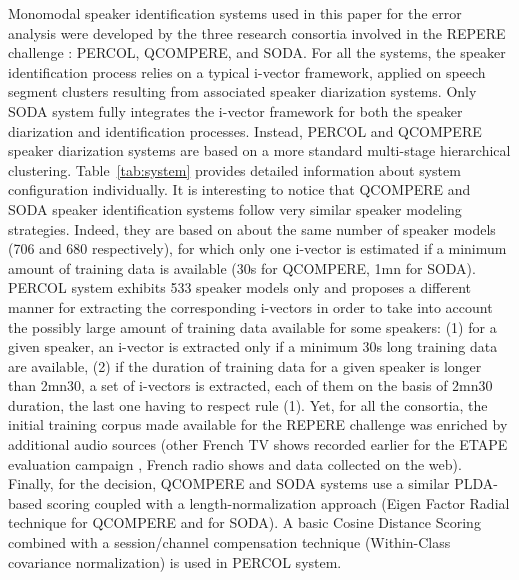 Monomodal speaker identification systems used in this paper for the error analysis were developed by the three research consortia involved in the REPERE challenge : PERCOL, QCOMPERE, and SODA. For all the systems, the speaker identification process relies on a typical i-vector framework, applied on speech segment clusters resulting from associated speaker diarization systems. Only SODA system  \cite{dupuy2014}  fully integrates the i-vector framework for both the speaker diarization and identification processes. Instead, PERCOL and QCOMPERE speaker diarization systems \cite{Barras2006,charlet2013} are based on a more standard multi-stage hierarchical clustering. Table~\ref{tab:system} provides detailed information about system configuration individually. It is interesting to notice that QCOMPERE and SODA speaker identification systems follow very similar speaker modeling strategies. Indeed, they are based on about the same number of speaker models (706 and 680 respectively), for which only one i-vector is estimated if a minimum amount of training data is available (30s for QCOMPERE, 1mn for SODA).  PERCOL system exhibits 533 speaker models only and proposes a different manner for extracting the corresponding i-vectors in order to take into account the possibly large amount of training data available for some speakers:  (1) for a given speaker, an i-vector is extracted only if a minimum 30s long training data are available, (2) if the duration of training data for a given speaker is longer than 2mn30, a set of i-vectors is extracted, each of them on the basis of 2mn30 duration, the last one having to respect rule (1). Yet, for all the consortia, the initial training corpus made available for the REPERE challenge was enriched by additional audio sources (other French TV shows recorded earlier for the ETAPE evaluation campaign \cite{gravier2012}, French radio shows and data collected on the web).
Finally, for the decision, QCOMPERE and SODA systems use a similar PLDA-based scoring coupled with a length-normalization approach (Eigen Factor Radial technique for QCOMPERE and for SODA). A basic Cosine Distance Scoring combined with a session/channel compensation technique (Within-Class covariance normalization)  is used in PERCOL system.


